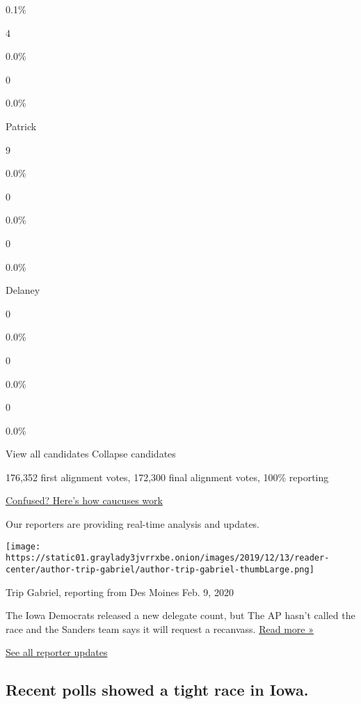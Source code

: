 0.1\%

4

0.0\%

0

0.0\%

 Patrick

9

0.0\%

0

0.0\%

0

0.0\%

 Delaney

0

0.0\%

0

0.0\%

0

0.0\%

View all candidates Collapse candidates

176,352 first alignment votes, 172,300 final alignment votes, 100\%
reporting

\href{https://www.nytimes3xbfgragh.onion/interactive/2020/02/20/us/politics/how-nevada-caucuses-work.html}{Confused?
Here's how caucuses work}

Our reporters are providing real-time analysis and updates.

\texttt{[image: https://static01.graylady3jvrrxbe.onion/images/2019/12/13/reader-center/author-trip-gabriel/author-trip-gabriel-thumbLarge.png]}

Trip Gabriel, reporting from Des Moines Feb. 9, 2020

The Iowa Democrats released a new delegate count, but The AP hasn't
called the race and the Sanders team says it will request a recanvass.
\href{https://www.nytimes3xbfgragh.onion/2020/02/09/us/politics/iowa-caucuses-democrats.html?action=click\&module=ELEX_results\&pgtype=Interactive\&region=ReporterUpdates}{Read
more »}

\href{https://www.nytimes3xbfgragh.onion/interactive/2020/02/03/us/elections/results-iowa-caucus-live-updates.html?action=click\&module=ELEX_results\&pgtype=Interactive\&region=Component}{See
all reporter updates}

\hypertarget{recent-polls-showed-a-tight-race-in-iowa}{%
\subsection{Recent polls showed a tight race in
Iowa.}\label{recent-polls-showed-a-tight-race-in-iowa}}

